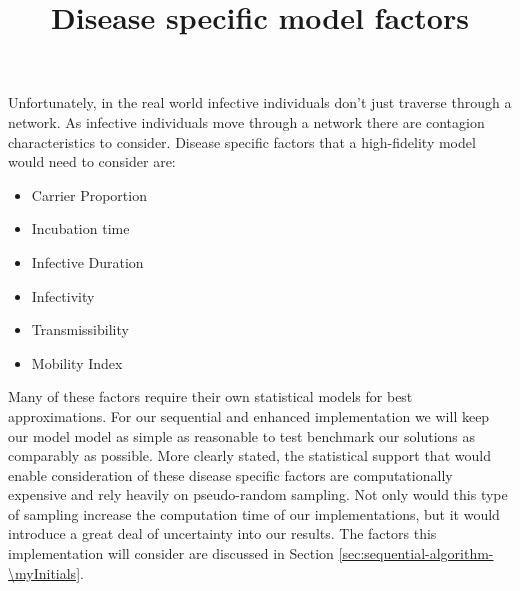 Unfortunately, in the real world infective individuals don't just traverse through a network. As infective individuals move through a network there are contagion characteristics to consider. Disease specific factors that a high-fidelity model would need to consider are:
\begin{center}
    \title{Disease specific model factors}
    \parbox[t]{2.4in}{
        \raggedright%
        \begin{itemize}[topsep=0pt,itemsep=-2pt,leftmargin=13pt]
            \item Carrier Proportion
            \item Incubation time
            \item Infective Duration
        \end{itemize}
    }%
    \parbox[t]{2.4in}{
        \raggedright%
        \begin{itemize}[topsep=0pt,itemsep=-2pt,leftmargin=13pt]
            \item Infectivity
            \item Transmissibility 
            \item Mobility Index
        \end{itemize}
    }
\end{center}


Many of these factors require their own statistical models for best approximations. For our sequential and enhanced implementation we will keep our model model as simple as reasonable to test benchmark our solutions as comparably as possible. More clearly stated, the statistical support that would enable consideration of these disease specific factors are computationally expensive and rely heavily on pseudo-random sampling. Not only would this type of sampling increase the computation time of our implementations, but it would introduce a great deal of uncertainty into our results. The factors this implementation will consider are discussed in Section \ref{sec:sequential-algorithm-\myInitials}.

